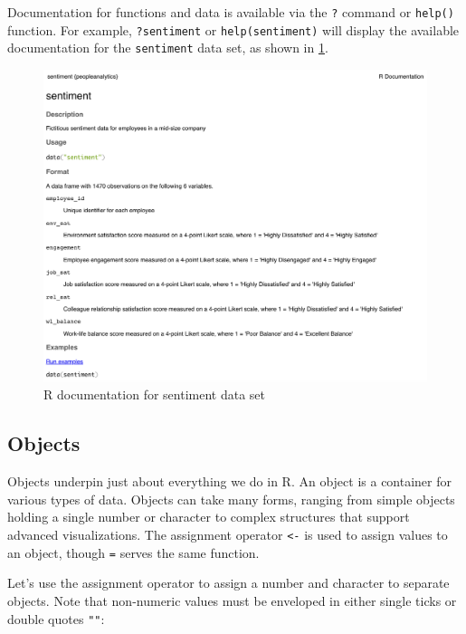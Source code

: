 \documentclass[
]{book}
\begin{document}
Documentation for functions and data is available via the \texttt{?} command or \texttt{help()} function. For example, \texttt{?sentiment} or \texttt{help(sentiment)} will display the available documentation for the \texttt{sentiment} data set, as shown in \ref{fig:r-help}.

\begin{figure}

{\centering \includegraphics[width=1\linewidth]{graphics/r_help} 

}

\caption{R documentation for sentiment data set}\label{fig:r-help}
\end{figure}

\hypertarget{objects}{%
\subsection{Objects}\label{objects}}

Objects underpin just about everything we do in R. An object is a container for various types of data. Objects can take many forms, ranging from simple objects holding a single number or character to complex structures that support advanced visualizations. The assignment operator \texttt{\textless{}-} is used to assign values to an object, though \texttt{=} serves the same function.

Let's use the assignment operator to assign a number and character to separate objects. Note that non-numeric values must be enveloped in either single ticks \texttt{\textquotesingle{}\textquotesingle{}} or double quotes \texttt{""}:
\end{document}
